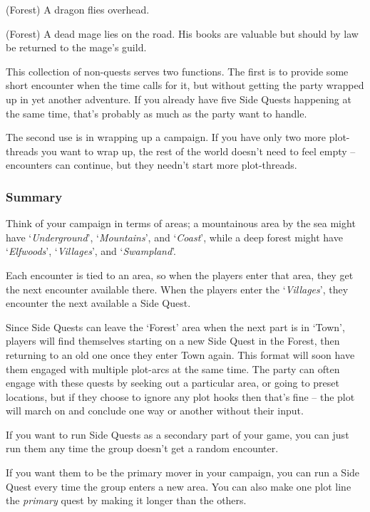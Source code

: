 \begin{multicols}{2}
\begin{list}{\Square}{}
	\item{(Forest) A dragon flies overhead.}

	\item{(Forest) A dead mage lies on the road. His books are valuable but should by law be returned to the mage's guild.}

\end{list}

This collection of non-quests serves two functions.
The first is to provide some short encounter when the time calls for it, but without getting the party wrapped up in yet another adventure.
If you already have five Side Quests happening at the same time, that's probably as much as the party want to handle.

The second use is in wrapping up a campaign.
If you have only two more plot-threads you want to wrap up, the rest of the world doesn't need to feel empty -- encounters can continue, but they needn't start more plot-threads.

\subsubsection{Summary}

Think of your campaign in terms of areas; a mountainous area by the sea might have `\emph{Underground}', `\emph{Mountains}', and `\emph{Coast}', while a deep forest might have `\emph{Elfwoods}', `\emph{Villages}', and `\emph{Swampland}'.

Each encounter is tied to an area, so when the players enter that area, they get the next encounter available there.
When the players enter the `\emph{Villages}', they encounter the next available a Side Quest.

Since Side Quests can leave the `Forest' area when the next part is in `Town', players will find themselves starting on a new Side Quest in the Forest, then returning to an old one once they enter Town again.
This format will soon have them engaged with multiple plot-arcs at the same time.
The party can often engage with these quests by seeking out a particular area, or going to preset locations, but if they choose to ignore any plot hooks then that's fine -- the plot will march on and conclude one way or another without their input.

If you want to run Side Quests as a secondary part of your game, you can just run them any time the group doesn't get a random encounter.

If you want them to be the primary mover in your campaign, you can run a Side Quest every time the group enters a new area.
You can also make one plot line the \emph{primary} quest by making it longer than the others.


\end{multicols}
